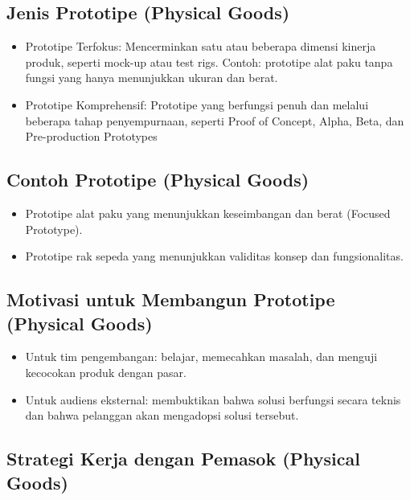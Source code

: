 \documentclass{article}
\begin{document}
\subsection{Jenis Prototipe (Physical Goods)}
\begin{itemize}
    \item Prototipe Terfokus: Mencerminkan satu atau beberapa dimensi kinerja produk, seperti mock-up atau test rigs. Contoh: prototipe alat paku tanpa fungsi yang hanya menunjukkan ukuran dan berat.
    \item Prototipe Komprehensif: Prototipe yang berfungsi penuh dan melalui beberapa tahap penyempurnaan, seperti Proof of Concept, Alpha, Beta, dan Pre-production Prototypes
\end{itemize}

\subsection{Contoh Prototipe (Physical Goods)}
\begin{itemize}
    \item Prototipe alat paku yang menunjukkan keseimbangan dan berat (Focused Prototype).
    \item Prototipe rak sepeda yang menunjukkan validitas konsep dan fungsionalitas.
\end{itemize}

\subsection{Motivasi untuk Membangun Prototipe (Physical Goods)}
\begin{itemize}
    \item Untuk tim pengembangan: belajar, memecahkan masalah, dan menguji kecocokan produk dengan pasar.
    \item Untuk audiens eksternal: membuktikan bahwa solusi berfungsi secara teknis dan bahwa pelanggan akan mengadopsi solusi tersebut.
\end{itemize}

\subsection{Strategi Kerja dengan Pemasok (Physical Goods)}
\end{document}
